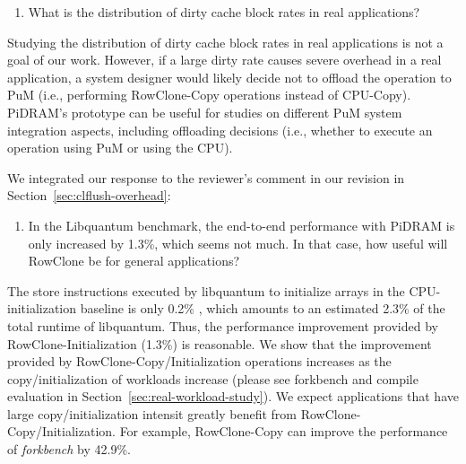 \bigbreak
\begin{tcolorbox}
    \begin{enumerate}[label=R1/\arabic*]
       \addtocounter{enumi}{3}
        \item \label{q:r1q4} What is the distribution of dirty cache block rates in real applications?
    \end{enumerate}
\end{tcolorbox} 

Studying the distribution of dirty cache block rates in real applications is not a goal of our work. However, if a large dirty  rate causes severe overhead in a real application, a system designer would likely decide not to offload the operation to PuM (i.e., performing RowClone-Copy operations instead of CPU-Copy). PiDRAM’s prototype can be useful for studies on different PuM system integration aspects, including offloading decisions (i.e., whether to execute an operation using PuM or using the CPU).

We integrated our response to the reviewer's comment in our revision in Section~\ref{sec:clflush-overhead}:


\vspace{5pt}
\yyboxbegin 
\yyboxend 

\bigbreak
\begin{tcolorbox}
    \begin{enumerate}[label=R1/\arabic*]
        \addtocounter{enumi}{4}
        \item \label{q:r1q5} In the Libquantum benchmark, the end-to-end performance with PiDRAM is only increased by 1.3\%, which seems not much. In that case, how useful will RowClone be for general applications?
    \end{enumerate}
\end{tcolorbox} 

The store instructions executed by libquantum to initialize arrays in the CPU-initialization baseline is only 0.2\% , which amounts to an estimated 2.3\% of the total runtime of libquantum. Thus, the performance improvement provided by RowClone-Initialization (1.3\%) is reasonable. We show that the improvement provided by RowClone-Copy/Initialization operations increases as the copy/initialization  of workloads increase (please see forkbench and compile evaluation in Section~\ref{sec:real-workload-study}). We expect applications that have large copy/initialization intensit greatly benefit from RowClone-Copy/Initialization. For example, RowClone-Copy can improve the performance of \emph{forkbench} by 42.9\%.

